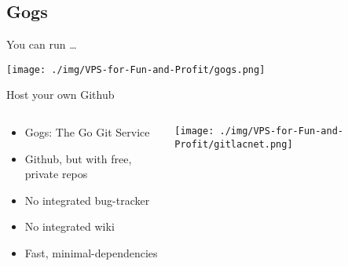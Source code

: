 \documentclass[presentation,aspectratio=169]{beamer}
\begin{document}
\subsection{Gogs}
\label{sec-4-4}
\begin{frame}[label=sec-4-4-1]{You can run \ldots{}}
\begin{center}
\texttt{[image: ./img/VPS-for-Fun-and-Profit/gogs.png]}
\end{center}
\end{frame}
\begin{frame}[label=sec-4-4-2]{Host your own Github}
\begin{columns}
\begin{column}{0.45\textwidth}

\begin{itemize}
\item Gogs: The Go Git Service
\item Github, but with free, private repos
\item No integrated bug-tracker
\item No integrated wiki
\item Fast, minimal-dependencies
\end{itemize}
\end{column}

\begin{column}{0.45\textwidth}

\texttt{[image: ./img/VPS-for-Fun-and-Profit/gitlacnet.png]}
\end{column}
\end{columns}
\end{frame}
\end{document}
